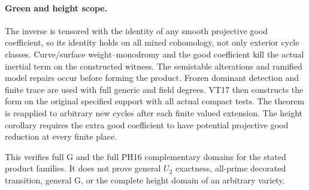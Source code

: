 \paragraph{Green and height scope.}
The inverse is tensored with the identity of any smooth projective good
coefficient, so its identity holds on all mixed cohomology, not only
exterior cycle classes. Curve/surface weight--monodromy and the good
coefficient kill the actual inertial term on the constructed witness.
The semistable alterations and ramified model repairs occur before
forming the product. Frozen dominant detection and finite trace are
used with full generic and field degrees. VT17 then constructs the
form on the original specified support with all actual compact tests.
The theorem is reapplied to arbitrary new cycles after each finite
valued extension. The height corollary requires the extra good
coefficient to have potential projective good reduction at every
finite place.

This verifies full G and the full PH16 complementary domains for the
stated product families. It does not prove general $U_2$ exactness,
all-prime decorated transition, general G, or the complete height
domain of an arbitrary variety.

